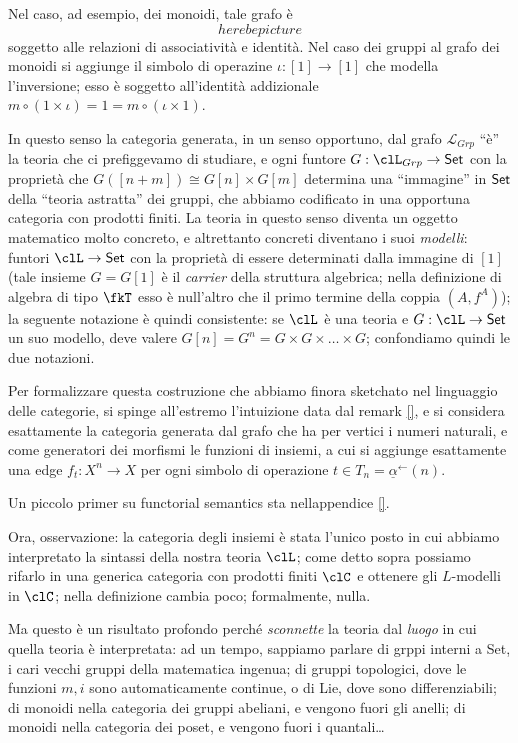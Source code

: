 \documentclass{amsart}
\begin{document}
Nel caso, ad esempio, dei monoidi, tale grafo è
\[here be picture\]
soggetto alle relazioni di associatività e identità. Nel caso dei gruppi al grafo dei monoidi si aggiunge il simbolo di operazine $\iota : [1] \to [1]$ che modella l'inversione; esso è soggetto all'identità addizionale $m \circ (1\times \iota) = 1 = m \circ (\iota \times 1)$.

In questo senso la categoria generata, in un senso opportuno, dal grafo $\mathcal{L}_{Grp}$ ``è'' la teoria che ci prefiggevamo di studiare, e ogni funtore $G: \clL_{Grp} \to \Set$ con la proprietà che $G([n+m]) \cong G[n] \times G[m]$ determina una ``immagine'' in $\mathsf{Set}$ della ``teoria astratta'' dei gruppi, che abbiamo codificato in una opportuna categoria con prodotti finiti. La teoria in questo senso diventa un oggetto matematico molto concreto, e altrettanto concreti diventano i suoi \emph{modelli}: funtori $\clL \to \Set$ con la proprietà di essere determinati dalla immagine di $[1]$ (tale insieme $G=G[1]$ è il \emph{carrier} della struttura algebrica; nella definizione di algebra di tipo $\fkT$ esso è null'altro che il primo termine della coppia $(A,f^A)$);  la seguente notazione è quindi consistente: se $\clL$ è una teoria e $G : \clL \to \Set$ un suo modello, deve valere $G[n]=G^n = G \times G \times\dots\times G$; confondiamo quindi le due notazioni.

Per formalizzare questa costruzione che abbiamo finora sketchato nel linguaggio delle categorie, si spinge all'estremo l'intuizione data dal remark \ref{}, e si considera esattamente la categoria generata dal grafo che ha per vertici i numeri naturali, e come generatori dei morfismi le funzioni di insiemi, a cui si aggiunge esattamente una edge $f_t : X^n \to X$ per ogni simbolo di operazione $t \in T_n = \underline{\alpha}^\leftarrow(n)$.

Un piccolo primer su functorial semantics sta nellappendice \ref{}.

Ora, osservazione: la categoria degli insiemi è stata l'unico posto in cui abbiamo interpretato la sintassi della nostra teoria $\clL$; come detto sopra possiamo rifarlo in una generica categoria con prodotti finiti $\clC$ e ottenere gli $L$-modelli in $\clC$; nella definizione cambia poco; formalmente, nulla. 

Ma questo è un risultato profondo perché \emph{sconnette} la teoria dal \emph{luogo} in cui quella teoria è interpretata: ad un tempo, sappiamo parlare di grppi interni a Set, i cari vecchi gruppi della matematica ingenua; di gruppi topologici, dove le funzioni $m,i$ sono automaticamente continue, o di Lie, dove sono differenziabili; di monoidi nella categoria dei gruppi abeliani, e vengono fuori gli anelli;  di monoidi nella categoria dei poset, e vengono fuori i quantali\dots
\end{document}
